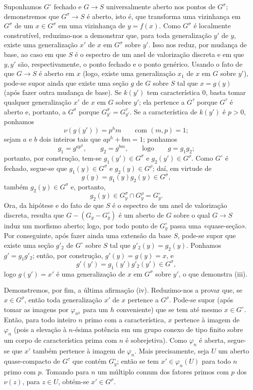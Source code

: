Suponhamos $G^\circ$ fechado e $G\longrightarrow S$ universalmente aberto nos
pontos de $G^\sigma$; demonstremos que $G^\sigma\longrightarrow S$ é aberto,
isto é, que transforma uma vizinhança em $G^\sigma$ de um $x\in G^\sigma$
em uma vizinhança de $y=f(x)$. Como $G^\sigma$ é localmente construtível,
reduzimo-nos a demonstrar que, para toda generalização $y'$ de $y$, existe uma
generalização $x'$ de $x$ em $G^\sigma$ sobre $y'$. Isso nos reduz, por
mudança de base, ao caso em que $S$ é o espectro de um anel de valorização
discreta e em que $y,y'$ são, respectivamente, o ponto fechado e o ponto
genérico. Usando o fato de que $G\longrightarrow S$ é aberto em $x$ (logo,
existe uma generalização $x_1$ de $x$ em $G$ sobre $y'$), pode-se supor ainda
que existe uma seção $g$ de $G$ sobre $S$ tal que $x=g(y)$ (após fazer outra
mudança de base). Se $k(y')$ tem característica 0, basta tomar qualquer
generalização $x'$ de $x$ em $G$ sobre $y'$; ela pertence a $G^\tau$ porque
$G^\tau$ é aberto e, portanto, a $G^\sigma$ porque
$G_{y'}^\sigma=G_{y'}^\tau$. Se a característica de $k(y')$ é $p>0$,
ponhamos
\[
\nu(g(y'))=p^hm\qquad\text{com }(m,p)=1 ;
\]
sejam $a$ e $b$ dois inteiros tais que $ap^h+bm=1$; ponhamos
\[
g_1=g^{ap^h},\qquad g_2=g^{bm},\qquad\text{logo}\qquad g=g_1g_2 ;
\]
portanto, por construção, tem-se $g_1(y')\in G^\sigma$ e
$g_2(y')\in G^\rho$. Como $G^\circ$ é fechado, segue-se que
$g_1(y)\in G^\sigma$ e $g_2(y)\in G^\rho$; daí, em virtude de
\[
g(y)=g_1(y)g_2(y)\in G^\sigma,
\]
também $g_2(y)\in G^\sigma$ e, portanto,
\[
g_2(y)\in G_y^\sigma\cap G_y^\rho=G_y^\circ.
\]
Ora, da hipótese e do fato de que $S$ é o espectro de um anel de valorização
discreta, resulta que $G-(G_y-G_y^\circ)$ é um aberto de $G$ sobre o qual
$G\longrightarrow S$ induz um morfismo aberto; logo, por todo ponto de
$G_y^\circ$ passa uma «quase-seção». Por conseguinte, após fazer ainda uma
extensão da base $S$, pode-se supor que existe uma seção $g'_2$ de $G^\circ$
sobre $S$ tal que $g'_2(y)=g_2(y)$. Ponhamos $g'=g_1g'_2$; então, por
construção, $g'(y)=g(y)=x$, e
\[
g'(y')=g_1(y')g'_2(y')\in G^\sigma,
\]
logo $g(y')=x'$ é uma generalização de $x$ em $G^\sigma$ sobre $y'$, o que demonstra
(iii).

Demonstremos, por fim, a última afirmação (iv). Reduzimo-nos a provar que, se
$x\in G^\rho$, então toda generalização $x'$ de $x$ pertence a $G^\rho$.
Pode-se supor (após tomar as imagens por $\varphi_{n^h}$ para um $h$
conveniente) que se tem até mesmo
$x\in G^\circ$. Então, para todo inteiro $n$ primo com a característica, $x$
pertence à imagem de $\varphi_n$ (pois a elevação à $n$-ésima potência em um
grupo conexo de tipo finito sobre um corpo de característica prima com $n$ é
sobrejetiva). Como $\varphi_n$ é aberta, segue-se que $x'$ também pertence à
imagem de $\varphi_n$. Mais precisamente, seja $U$ um aberto quase-compacto de
$G^\tau$ que contém $G_y^\circ$; então se tem $x'\in\varphi_n(U)$ para todo
$n$ primo com $p$. Tomando para $n$ um múltiplo comum dos fatores primos com
$p$ dos $\nu(z)$, para $z\in U$, obtém-se $x'\in G^\rho$.

